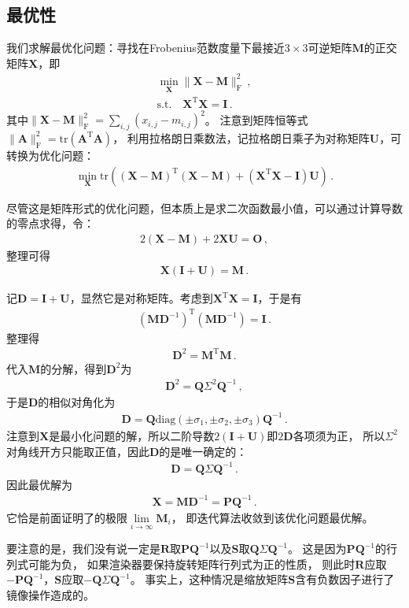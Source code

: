 \subsection{最优性}\label{sub:最优性02ex02}
\begin{prove}
    我们求解最优化问题：寻找在Frobenius范数度量下最接近$3\times3$可逆矩阵$\bm M$的正交矩阵$\bm X$，即
    \begin{align}
        \min\limits_{\bm X}{\|\bm X-\bm M\|_{\mathrm{F}}^2}\, , \\
        \mathrm{s.t.}\quad \bm X^{\mathrm{T}}\bm X=\bm I\, .
    \end{align}
    其中$\displaystyle\|\bm X-\bm M\|_{\mathrm{F}}^2=\sum\limits_{i,j}{(x_{i,j}-m_{i,j})^2}$。
    注意到矩阵恒等式$\|\bm A\|_{\mathrm{F}}^2=\mathrm{tr}(\bm A^{\mathrm{T}}\bm A)$，
    利用拉格朗日乘数法，记拉格朗日乘子为对称矩阵$\bm U$，可转换为优化问题：
    \begin{align}
        \min\limits_{\bm X}{\mathrm{tr}((\bm X-\bm M)^{\mathrm{T}}(\bm X-\bm M)+(\bm X^{\mathrm{T}}\bm X-\bm I)\bm U)}\, .
    \end{align}

    尽管这是矩阵形式的优化问题，但本质上是求二次函数最小值，可以通过计算导数的零点求得，令：
    \begin{align}
        2(\bm X-\bm M)+2\bm X\bm U=\bm O\, ,
    \end{align}
    整理可得
    \begin{align}
        \bm X(\bm I+\bm U)=\bm M\, .
    \end{align}

    记$\bm D=\bm I+\bm U$，显然它是对称矩阵。考虑到$\bm X^{\mathrm{T}}\bm X=\bm I$，于是有
    \begin{align}
        (\bm M\bm D^{-1})^{\mathrm{T}}(\bm M\bm D^{-1})=\bm I\, .
    \end{align}
    整理得
    \begin{align}
        \bm D^2=\bm M^{\mathrm{T}}\bm M\, .
    \end{align}
    代入$\bm M$的分解，得到$\bm D^2$为
    \begin{align}
        \bm D^2=\bm Q\varSigma^2\bm Q^{-1}\, ,
    \end{align}
    于是$\bm D$的相似对角化为
    \begin{align}
        \bm D=\bm Q\mathrm{diag}(\pm\sigma_1,\pm\sigma_2,\pm\sigma_3)\bm Q^{-1}\, .
    \end{align}
    注意到$\bm X$是最小化问题的解，所以二阶导数$2(\bm I+\bm U)$即$2\bm D$各项须为正，
    所以$\varSigma^2$对角线开方只能取正值，因此$\bm D$的是唯一确定的：
    \begin{align}
        \bm D=\bm Q\varSigma\bm Q^{-1}\, .
    \end{align}
    因此最优解为
    \begin{align}
        \bm X=\bm M\bm D^{-1}=\bm P\bm Q^{-1}\, .
    \end{align}
    它恰是前面证明了的极限$\lim\limits_{i\rightarrow\infty}\bm M_i$，
    即迭代算法收敛到该优化问题最优解。
\end{prove}

要注意的是，我们没有说一定是$\bm R$取$\bm P\bm Q^{-1}$以及$\bm S$取$\bm Q\varSigma\bm Q^{-1}$。
这是因为$\bm P\bm Q^{-1}$的行列式可能为负，
如果渲染器要保持旋转矩阵行列式为正的性质，
则此时$\bm R$应取$-\bm P\bm Q^{-1}$，$\bm S$应取$-\bm Q\varSigma\bm Q^{-1}$。
事实上，这种情况是缩放矩阵$\bm S$含有负数因子进行了镜像操作造成的。